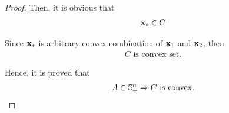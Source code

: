\documentclass[11pt,a4paper]{article}
\begin{document}
\begin{proof}
    Then, it is obvious that 
    \begin{align}
        \mathbf{x}_{*} \in C
    \end{align}

    Since $\mathbf{x}_{*}$ is arbitrary convex combination of $\mathbf{x}_{1}$ and $\mathbf{x}_{2}$, then
    \begin{align}
        \text{$C$ is convex set.}
    \end{align}

    Hence, it is proved that 
    \begin{align}
        A \in \mathbb{S}_{+}^{n} \Rightarrow \text{$C$ is convex.}
    \end{align}
\end{proof}

\newpage
\newcommand{\Rn}{\mathbb{R}^{n}}
\newcommand{\glinear}[1]{\ensuremath{g^T #1}}
\newcommand{\Apgg} {\ensuremath{A + \lambda gg^T}}
\newcommand{\lambdaopt} {\ensuremath{\lambda^{*}}}
\newcommand{\Apggquadratic}[1]{\ensuremath{#1^{T} (A + \lambdaopt gg^T) #1}}
\newcommand{\ggquadratic}[1]{\ensuremath{#1^{T} (\lambdaopt gg^T) #1}}
\end{document}
